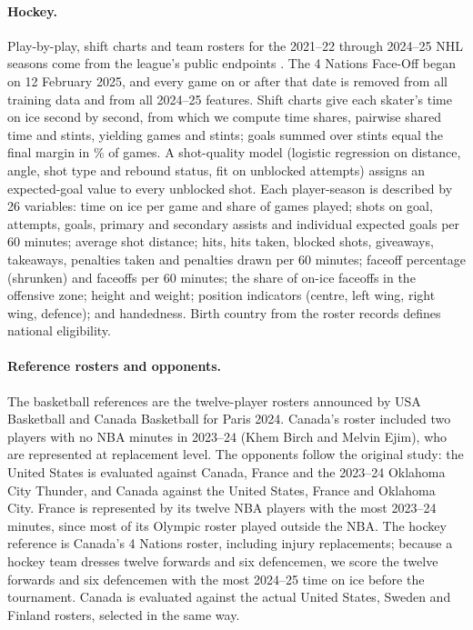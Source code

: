 \paragraph{Hockey.} Play-by-play, shift charts and team rosters for the 2021--22 through 2024--25 NHL seasons come from the league's public endpoints \citep{nhlapi}. The 4 Nations Face-Off began on 12 February 2025, and every game on or after that date is removed from all training data and from all 2024--25 features. Shift charts give each skater's time on ice second by second, from which we compute time shares, pairwise shared time and stints, yielding  games and  stints; goals summed over stints equal the final margin in \% of games. A shot-quality model (logistic regression on distance, angle, shot type and rebound status, fit on  unblocked attempts) assigns an expected-goal value to every unblocked shot. Each player-season is described by 26 variables: time on ice per game and share of games played; shots on goal, attempts, goals, primary and secondary assists and individual expected goals per 60 minutes; average shot distance; hits, hits taken, blocked shots, giveaways, takeaways, penalties taken and penalties drawn per 60 minutes; faceoff percentage (shrunken) and faceoffs per 60 minutes; the share of on-ice faceoffs in the offensive zone; height and weight; position indicators (centre, left wing, right wing, defence); and handedness. Birth country from the roster records defines national eligibility.

\paragraph{Reference rosters and opponents.} The basketball references are the twelve-player rosters announced by USA Basketball and Canada Basketball for Paris 2024. Canada's roster included two players with no NBA minutes in 2023--24 (Khem Birch and Melvin Ejim), who are represented at replacement level. The opponents follow the original study: the United States is evaluated against Canada, France and the 2023--24 Oklahoma City Thunder, and Canada against the United States, France and Oklahoma City. France is represented by its twelve NBA players with the most 2023--24 minutes, since most of its Olympic roster played outside the NBA. The hockey reference is Canada's 4 Nations roster, including injury replacements; because a hockey team dresses twelve forwards and six defencemen, we score the twelve forwards and six defencemen with the most 2024--25 time on ice before the tournament. Canada is evaluated against the actual United States, Sweden and Finland rosters, selected in the same way.
